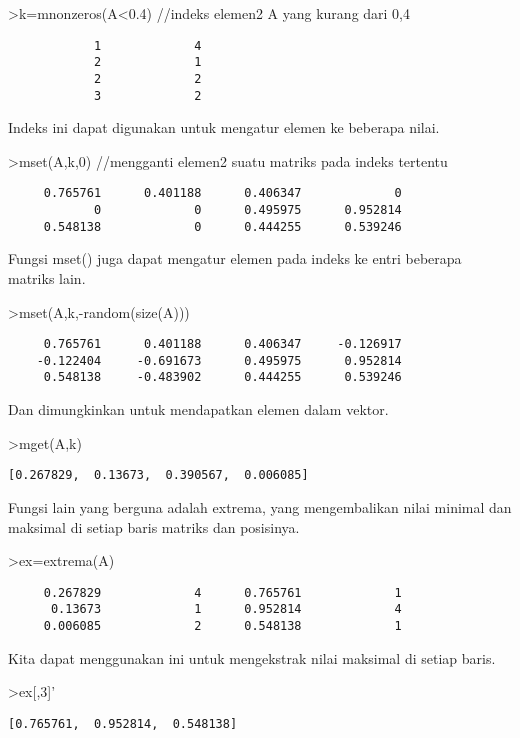 \documentclass[
]{book}
\begin{document}
\textgreater k=mnonzeros(A\textless0.4) //indeks elemen2 A yang kurang dari 0,4

\begin{verbatim}
            1             4 
            2             1 
            2             2 
            3             2 
\end{verbatim}

Indeks ini dapat digunakan untuk mengatur elemen ke beberapa nilai.

\textgreater mset(A,k,0) //mengganti elemen2 suatu matriks pada indeks tertentu

\begin{verbatim}
     0.765761      0.401188      0.406347             0 
            0             0      0.495975      0.952814 
     0.548138             0      0.444255      0.539246 
\end{verbatim}

Fungsi mset() juga dapat mengatur elemen pada indeks ke entri beberapa matriks lain.

\textgreater mset(A,k,-random(size(A)))

\begin{verbatim}
     0.765761      0.401188      0.406347     -0.126917 
    -0.122404     -0.691673      0.495975      0.952814 
     0.548138     -0.483902      0.444255      0.539246 
\end{verbatim}

Dan dimungkinkan untuk mendapatkan elemen dalam vektor.

\textgreater mget(A,k)

\begin{verbatim}
[0.267829,  0.13673,  0.390567,  0.006085]
\end{verbatim}

Fungsi lain yang berguna adalah extrema, yang mengembalikan nilai minimal dan maksimal di setiap baris matriks dan posisinya.

\textgreater ex=extrema(A)

\begin{verbatim}
     0.267829             4      0.765761             1 
      0.13673             1      0.952814             4 
     0.006085             2      0.548138             1 
\end{verbatim}

Kita dapat menggunakan ini untuk mengekstrak nilai maksimal di setiap baris.

\textgreater ex{[},3{]}'

\begin{verbatim}
[0.765761,  0.952814,  0.548138]
\end{verbatim}
\end{document}

